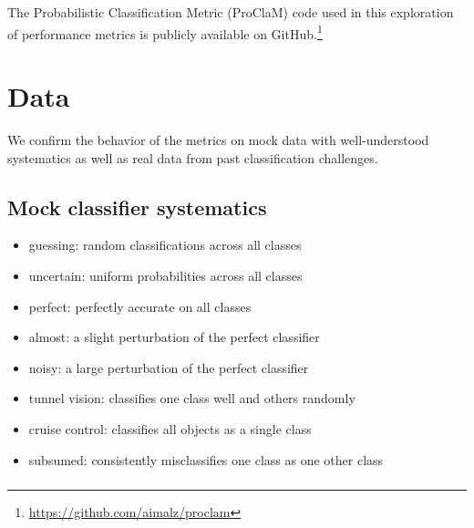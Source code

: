 \documentclass[\docopts]{\docclass}
\begin{document}
The Probabilistic Classification Metric (ProClaM) code used in this exploration of performance metrics is publicly available on GitHub.\footnote{\url{https://github.com/aimalz/proclam}}

\section{Data}
\label{sec:data}

We confirm the behavior of the metrics on mock data with well-understood systematics as well as real data from past classification challenges.

\subsection{Mock classifier systematics}
\label{sec:mockdata}

\begin{itemize}
\item    guessing: random classifications across all classes
\item    uncertain: uniform probabilities across all classes
\item    perfect: perfectly accurate on all classes
\item    almost: a slight perturbation of the perfect classifier
\item    noisy: a large perturbation of the perfect classifier
\item    tunnel vision: classifies one class well and others randomly
\item    cruise control: classifies all objects as a single class
\item    subsumed: consistently misclassifies one class as one other class
\end{itemize}

\subsubsection{}
\label{sec:guessing}

\subsubsection{}
\label{sec:uncertain}

\subsubsection{}
\label{sec:perfect}
\end{document}
